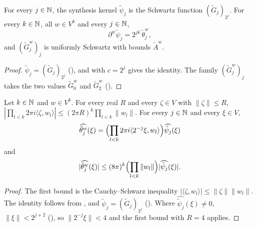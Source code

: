 \begin{lemma}
\label{lem:psi-dual-derivatives}
\leanok
{}
For every $j \in \mathbb{N}$, the synthesis kernel $\tilde\psi_j$ is the Schwartz function
$(\tilde G_j)_{2^j}$. For every $k \in \mathbb{N}$, all $w \in V^k$ and every $j \in \mathbb{N}$,
\[
  \partial^w \tilde\psi_j = 2^{jk} \, \tilde\theta^w_j ,
\]
and $(\tilde G^w_j)_j$ is uniformly Schwartz with bounds $\tilde A^w$.
\end{lemma}

\begin{proof}
\leanok
$\tilde\psi_j = (\tilde G_j)_{2^j}$ (), and 
with $c = 2^j$ gives the identity. The family $(\tilde G^w_j)_j$ takes the two values
$\tilde G^w_0$ and $\tilde G^w_2$ ().
\end{proof}

\begin{lemma}
\label{lem:dual-derivative-frequency}
\leanok
{}
Let $k \in \mathbb{N}$ and $w \in V^k$. For every real $R$ and every $\zeta \in V$ with
$\|\zeta\| \leq R$,
$|\prod_{l < k} 2\pi i \langle \zeta, w_l \rangle| \leq (2\pi R)^k \prod_{l < k} \|w_l\|$. For every
$j \in \mathbb{N}$ and every $\xi \in V$,
\[
  \widehat{\tilde\theta^w_j}(\xi) = \Bigl( \prod_{l < k} 2\pi i \langle 2^{-j} \xi, w_l \rangle
  \Bigr) \widehat{\tilde\psi_j}(\xi)
\]
and
\[
  |\widehat{\tilde\theta^w_j}(\xi)| \leq (8\pi)^k \Bigl( \prod_{l < k} \|w_l\| \Bigr)
  |\widehat{\tilde\psi_j}(\xi)| .
\]
\end{lemma}

\begin{proof}
\leanok
The first bound is the Cauchy--Schwarz inequality
$|\langle \zeta, w_l \rangle| \leq \|\zeta\| \|w_l\|$. The identity follows from
,  and
$\tilde\psi_j = (\tilde G_j)_{2^j}$ (). Where
$\widehat{\tilde\psi_j}(\xi) \neq 0$, $\|\xi\| < 2^{j+2}$ (), so
$\|2^{-j} \xi\| < 4$ and the first bound with $R = 4$ applies.
\end{proof}

